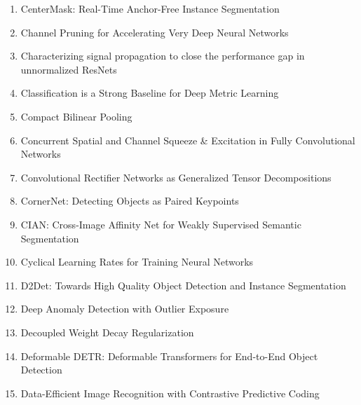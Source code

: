 \documentclass[acmlarge]{acmart}
\begin{document}
\begin{enumerate}
	\item CenterMask: Real-Time Anchor-Free Instance Segmentation \cite{Lee2020CenterMaskRA} 

	\item Channel Pruning for Accelerating Very Deep Neural Networks \cite{He2017ChannelPF} 

	\item Characterizing signal propagation to close the performance gap in unnormalized ResNets \cite{Brock2021CharacterizingSP} 

	\item Classification is a Strong Baseline for Deep Metric Learning \cite{Zhai2019ClassificationIA} 

	\item Compact Bilinear Pooling \cite{Gao2016CompactBP} 

	\item Concurrent Spatial and Channel Squeeze \& Excitation in Fully Convolutional Networks \cite{Roy2018ConcurrentSA} 

	\item Convolutional Rectifier Networks as Generalized Tensor Decompositions \cite{Cohen2016ConvolutionalRN} 

	\item CornerNet: Detecting Objects as Paired Keypoints \cite{Law2018CornerNetDO} 

	\item CIAN: Cross-Image Affinity Net for Weakly Supervised Semantic Segmentation \cite{Fan2020CIANCA} 

	\item Cyclical Learning Rates for Training Neural Networks \cite{Smith2017CyclicalLR} 

	\item D2Det: Towards High Quality Object Detection and Instance Segmentation \cite{Cao2020D2DetTH} 

	\item Deep Anomaly Detection with Outlier Exposure \cite{Hendrycks2019DeepAD} 

	\item Decoupled Weight Decay Regularization \cite{Loshchilov2019DecoupledWD} 

	\item Deformable DETR: Deformable Transformers for End-to-End Object Detection \cite{Zhu2021DeformableDD} 

	\item Data-Efficient Image Recognition with Contrastive Predictive Coding \cite{Hnaff2020DataEfficientIR} 


\end{enumerate}
\end{document}

